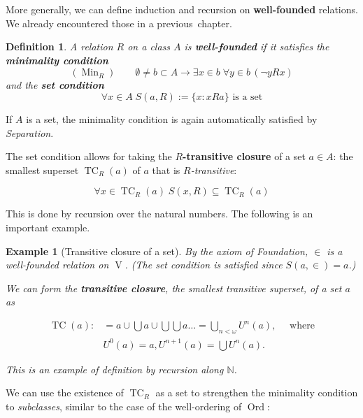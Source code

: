 \documentclass{article}
\newcommand{\Ord}{\operatorname{Ord}}
\newcommand{\V}{\Op{V}}
\newcommand{\Op}[1]{\operatorname{#1}}
\newcommand{\Nat}{\mathbb{N}}
\newtheorem{definition}{Definition}[section]
\newtheorem{example}{Example}[section]
\begin{document}
More generally, we can define induction and recursion on \textbf{well-founded} relations. We already encountered those in a previous~chapter.

\begin{definition}\label{def-well-founded}A relation $R$ on a class $A$ is \textbf{well-founded} if it satisfies the \textbf{minimality condition}
\begin{equation*}
(\Op{Min}_R) \qquad  \emptyset \neq b \subset A \to \exists x \in b \; \forall y \in b \, (  \neg y R x)
\end{equation*}
and the \textbf{set condition}
\begin{equation*}
\forall x \in A \; S(a,R):= \{x \colon x R a\} \text{ is a set}
\end{equation*}
\end{definition}If $A$ is a set, the minimality condition is again automatically satisfied by \textit{Separation}.

The set condition allows for taking the \textbf{$R$-transitive closure} of a set $a \in A$: the smallest superset $\Op{TC}_R(a)$ of $a$ that is \textit{$R$-transitive}:

\begin{equation}
\forall x \in \Op{TC}_R(a)\; S(x,R) \subseteq  \Op{TC}_R(a)
\end{equation}

This is done by recursion over the natural numbers. The following is an important example.

\begin{example}[Transitive closure of a set]\label{exa-trans-closure}By the axiom of \textit{Foundation}, $\in$ is a well-founded relation on $\V$. (The set condition is satisfied since $S(a,\in)=a$.)

We can form the \textbf{transitive closure}, the smallest transitive superset, of a set $a$ as

\begin{align*}
    \Op{TC}(a):&= a \cup \bigcup a \cup \bigcup \bigcup a \ldots 
 = \bigcup_{n< \omega} U^n(a), \quad \text{ where} \\ 
 &U^0(a) = a, U^{n+1}(a) = \bigcup U^n(a).
\end{align*}

This is an example of definition by recursion along $\Nat$.

\end{example}We can use the existence of $\Op{TC}_R$ as a set to strengthen the minimality condition to \textit{subclasses}, similar to the case of the well-ordering of $\Ord$:
\end{document}
